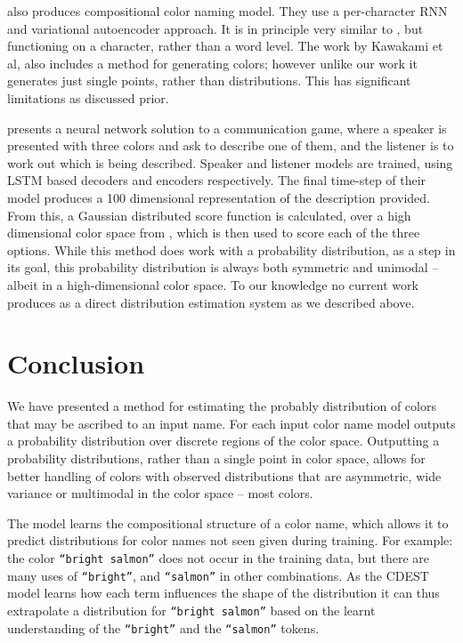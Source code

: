 \documentclass[11pt,a4paper]{article}
\newcommand{\textcite}{\cite}
\begin{document}
\textcite{DBLP:journals/corr/KawakamiDRS16} also produces compositional color naming model.
They use a per-character RNN and variational autoencoder approach.
It is in principle very similar to \textcite{2016arXiv160603821M}, but functioning on a character, rather than a word level.
The work by Kawakami et al, also includes a method for generating colors; however unlike our work it generates just single points, rather than distributions.
This has significant limitations as discussed prior.

\textcite{DBLP:journals/corr/MonroeHGP17} presents a neural network solution to a communication game, where a speaker is presented with three colors and ask to describe one of them, and the listener is to work out which is being described.
Speaker and listener models are trained, using LSTM based decoders and encoders respectively.
The final time-step of their model produces a 100 dimensional representation of the description provided.
From this, a Gaussian distributed score function is calculated, over a high dimensional color space from \textcite{2016arXiv160603821M}, which is then used to score each of the three options.
While this method does work with a probability distribution, as a step in its goal,
this probability distribution is always both symmetric and unimodal -- albeit in a high-dimensional color space.
To our knowledge no current work produces as a direct distribution estimation system as we described above.


\section{Conclusion}\label{sec:conclusion}
We have presented a method for estimating the probably distribution of colors that may be ascribed to an input name.
For each input color name model outputs a probability distribution over discrete regions of the color space.
Outputting a probability distributions, rather than a single point in color space, allows for better handling of colors with observed distributions that are asymmetric, wide variance or multimodal in the color space -- most colors.

The model learns the compositional structure of a color name, which allows it to predict distributions for color names not seen given during training.
For example: the color \texttt{``bright salmon''} does not occur in the training data, but there are many uses of \texttt{``bright''}, and \texttt{``salmon''} in other combinations.
As the CDEST model learns how each term influences the shape of the distribution it can thus extrapolate a distribution for \texttt{``bright salmon''} based on the learnt understanding of the \texttt{``bright''} and the \texttt{``salmon''} tokens.
\end{document}
